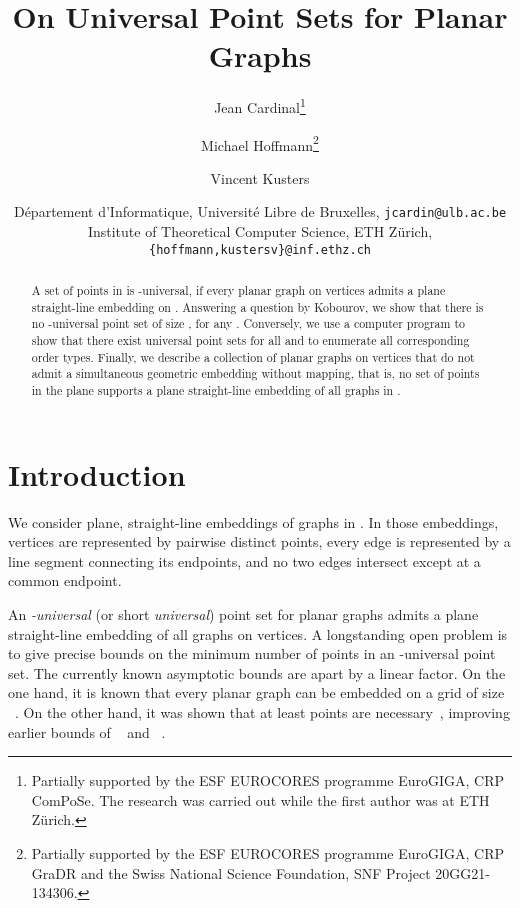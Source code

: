 \documentclass[11pt]{article}
\begin{document}
\title{On Universal Point Sets for Planar Graphs}

\author{Jean Cardinal\thanks{Partially supported by the ESF EUROCORES
    programme EuroGIGA, CRP ComPoSe. The research was carried out while the
    first author was at ETH Z\"urich.} \and Michael
  Hoffmann\thanks{Partially supported by the ESF EUROCORES programme
    EuroGIGA, CRP GraDR and the Swiss National Science Foundation, SNF Project
    20GG21-134306.} \and Vincent Kusters}

\date{\small D\'epartement d'Informatique, Universit\'e Libre de
  Bruxelles, \texttt{jcardin@ulb.ac.be}\\
  Institute of Theoretical Computer Science, ETH Z\"urich,
  \texttt{\{hoffmann,kustersv\}@inf.ethz.ch}}



\maketitle \begin{abstract}
  A set  of points in  is -universal, if every planar graph on 
  vertices admits a plane straight-line embedding on . Answering a question
  by Kobourov, we show that there is no -universal point set of size , for
  any . Conversely, we use a computer program to show that there exist
  universal point sets for all  and to enumerate all corresponding
  order types. Finally, we describe a collection  of  planar
  graphs on  vertices that do not admit a simultaneous geometric embedding
  without mapping, that is, no set of  points in the plane supports a plane
  straight-line embedding of all graphs in .
\end{abstract}
\sloppy

\section{Introduction}
\label{sec:introduction}

We consider plane, straight-line embeddings of graphs in . In those
embeddings, vertices are represented by pairwise distinct points, every edge is
represented by a line segment connecting its endpoints, and no two edges
intersect except at a common endpoint.

An {\em -universal} (or short \emph{universal}) point set for planar graphs
admits a plane straight-line embedding of all graphs on  vertices. A
longstanding open problem is to give precise bounds on the minimum number of
points in an -universal point set. The currently known asymptotic bounds are
apart by a linear factor. On the one hand, it is known that every planar graph
can be embedded on a grid of size ~\cite{fpp-hdpgg-90,s-epgg-90}. On the other hand, it was shown that at
least  points are necessary~\cite{Kurowski04}, improving earlier bounds
of ~\cite{ck-lbsuspg-89} and ~\cite{fpp-hdpgg-90}.
\end{document}
